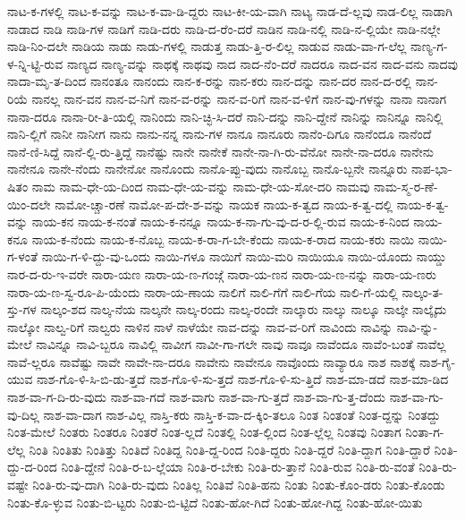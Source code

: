 {ನಾಟ-ಕ-ಗಳಲ್ಲಿ
ನಾಟ-ಕ-ವನ್ನು
ನಾಟ-ಕ-ವಾ-ಡಿ-ದ್ದರು
ನಾಟ-ಕೀ-ಯ-ವಾಗಿ
ನಾಟ್ಯ
ನಾಡ-ದೆ-ಲ್ಲವು
ನಾಡ-ಲಿಲ್ಲ
ನಾಡಾಗಿ
ನಾಡಾದ
ನಾಡಿ
ನಾಡಿ-ಗಳ
ನಾಡಿಗೆ
ನಾಡಿ-ದರು
ನಾಡಿ-ದ-ರೆಂ-ದರೆ
ನಾಡಿನ
ನಾಡಿ-ನಲ್ಲಿ
ನಾಡಿ-ನ-ಲ್ಲಿಯೇ
ನಾಡಿ-ನಲ್ಲೇ
ನಾಡಿ-ನಿಂ-ದಲೇ
ನಾಡಿಯ
ನಾಡು
ನಾಡು-ಗಳಲ್ಲಿ
ನಾಡುತ್ತ
ನಾಡು-ತ್ತಿ-ರ-ಲಿಲ್ಲ
ನಾಡುವ
ನಾಡು-ವಾ-ಗ-ಲೆಲ್ಲ
ನಾಣ್ಯ-ಗ-ಳ-ನ್ನಿ-ಟ್ಟಿ-ರುವ
ನಾಣ್ಯದ
ನಾಣ್ಯ-ವನ್ನು
ನಾಥಕ್ಕೆ
ನಾಥವು
ನಾದ
ನಾದ-ನೆಂ-ದರೆ
ನಾದರೂ
ನಾದ-ವನ
ನಾದ-ವನು
ನಾದವು
ನಾದಾ-ಮೃ-ತ-ದಿಂದ
ನಾನಂತೂ
ನಾನಂದು
ನಾನ-ಕ-ರನ್ನು
ನಾನ-ಕರು
ನಾನ-ದನ್ನು
ನಾನ-ದರ
ನಾನ-ದ-ರಲ್ಲಿ
ನಾನ-ರಿಯೆ
ನಾನಲ್ಲ
ನಾನ-ವನ
ನಾನ-ವ-ನಿಗೆ
ನಾನ-ವ-ರನ್ನು
ನಾನ-ವ-ರಿಗೆ
ನಾನ-ವ-ಳಿಗೆ
ನಾನ-ವು-ಗಳನ್ನು
ನಾನಾ
ನಾನಾಗ
ನಾನಾ-ದರೂ
ನಾನಾ-ರೀ-ತಿ-ಯಲ್ಲಿ
ನಾನಿಂದು
ನಾನಿ-ಚ್ಛಿ-ಸಿ-ದರೆ
ನಾನಿ-ದನ್ನು
ನಾನಿ-ದ್ದೇನೆ
ನಾನಿನ್ನು
ನಾನಿನ್ನೂ
ನಾನಿಲ್ಲಿ
ನಾನಿ-ಲ್ಲಿಗೆ
ನಾನೀ
ನಾನೀಗ
ನಾನು
ನಾನು-ನನ್ನ
ನಾನು-ಗಳ
ನಾನೂ
ನಾನೂರು
ನಾನೆಂ-ದಿಗೂ
ನಾನೆಂದೂ
ನಾನೆಂದೆ
ನಾನೆ-ಣಿ-ಸಿದ್ದೆ
ನಾನೆ-ಲ್ಲಿ-ರು-ತ್ತಿದ್ದೆ
ನಾನೆಷ್ಟು
ನಾನೇ
ನಾನೇಕೆ
ನಾನೇ-ನಾ-ಗಿ-ರು-ವೆನೋ
ನಾನೇ-ನಾ-ದರೂ
ನಾನೇನು
ನಾನೇನೂ
ನಾನೇ-ನೆಂದು
ನಾನೇನೋ
ನಾನೊಂದು
ನಾನೊ-ಪ್ಪು-ವುದು
ನಾನೊಬ್ಬ
ನಾನೊ-ಬ್ಬನೇ
ನಾನ್ನೂರು
ನಾಪ-ಭಾ-ಷಿತಂ
ನಾಮ
ನಾಮ-ಧೇ-ಯ-ದಿಂದ
ನಾಮ-ಧೇ-ಯ-ವನ್ನು
ನಾಮ-ಧೇ-ಯ-ಸೋ-ದರಿ
ನಾಮವು
ನಾಮ-ಸ್ಮ-ರ-ಣೆ-ಯಿಂ-ದಲೇ
ನಾಮೋ-ಚ್ಚಾ-ರಣೆ
ನಾಮೋ-ಪ-ದೇ-ಶ-ವನ್ನು
ನಾಯಕ
ನಾಯ-ಕ-ತ್ವದ
ನಾಯ-ಕ-ತ್ವ-ದಲ್ಲಿ
ನಾಯ-ಕ-ತ್ವ-ವನ್ನು
ನಾಯ-ಕನ
ನಾಯ-ಕ-ನಂತೆ
ನಾಯ-ಕ-ನನ್ನೂ
ನಾಯ-ಕ-ನಾ-ಗು-ವು-ದ-ರ-ಲ್ಲಿ-ರುವ
ನಾಯ-ಕ-ನಿಂದ
ನಾಯ-ಕನೂ
ನಾಯ-ಕ-ನೆಂದು
ನಾಯ-ಕ-ನೊಬ್ಬ
ನಾಯ-ಕ-ರಾ-ಗ-ಬೇ-ಕೆಂದು
ನಾಯ-ಕ-ರಾದ
ನಾಯ-ಕರು
ನಾಯಿ
ನಾಯಿ-ಗ-ಳಂತೆ
ನಾಯಿ-ಗ-ಳಿ-ದ್ದು-ವು-ಒಂದು
ನಾಯಿ-ಗಳೂ
ನಾಯಿಗೆ
ನಾಯಿ-ಮರಿ
ನಾಯಿಯೂ
ನಾಯಿ-ಯೊಂದು
ನಾಯ್ಡು
ನಾರ-ದ-ರು-ಇ-ವರೇ
ನಾರಾ-ಯಣ
ನಾರಾ-ಯ-ಣ-ಗಂಜ್ಗೆ
ನಾರಾ-ಯ-ಣನ
ನಾರಾ-ಯ-ಣ-ನನ್ನು
ನಾರಾ-ಯ-ಣರು
ನಾರಾ-ಯ-ಣ-ಸ್ವ-ರೂ-ಪಿ-ಯೆಂದು
ನಾರಾ-ಯ-ಣಾಯ
ನಾಲಿಗೆ
ನಾಲಿ-ಗೆಗೆ
ನಾಲಿ-ಗೆಯ
ನಾಲಿ-ಗೆ-ಯಲ್ಲಿ
ನಾಲ್ಕಂ-ತ-ಸ್ತು-ಗಳ
ನಾಲ್ಕಂ-ಶದ
ನಾಲ್ಕ-ನೆಯ
ನಾಲ್ಕನೇ
ನಾಲ್ಕ-ರಂದು
ನಾಲ್ಕ-ರಂದೇ
ನಾಲ್ಕಾರು
ನಾಲ್ಕು
ನಾಲ್ಕೂ
ನಾಲ್ಕೇ
ನಾಲ್ಕೈದು
ನಾಲ್ಕೋ
ನಾಲ್ವ-ರಿಗೆ
ನಾಲ್ವರು
ನಾಳಿನ
ನಾಳೆ
ನಾಳೆಯೇ
ನಾವ-ದನ್ನು
ನಾವ-ವ-ರಿಗೆ
ನಾವಿಂದು
ನಾವಿನ್ನು
ನಾವಿ-ನ್ನು-ಮೇಲೆ
ನಾವಿನ್ನೂ
ನಾವಿ-ಬ್ಬರೂ
ನಾವಿಲ್ಲಿ
ನಾವೀಗ
ನಾವೀ-ಗಾ-ಗಲೇ
ನಾವು
ನಾವೂ
ನಾವೆಂದೂ
ನಾವೆಂ-ಬಂತೆ
ನಾವೆಲ್ಲ
ನಾವೆ-ಲ್ಲರೂ
ನಾವೆಷ್ಟು
ನಾವೇ
ನಾವೇ-ನಾ-ದರೂ
ನಾವೇನು
ನಾವೇನೂ
ನಾವೊಂದು
ನಾವ್ಯಾರೂ
ನಾಶ
ನಾಶಕ್ಕೆ
ನಾಶ-ಗೈ-ಯುವ
ನಾಶ-ಗೊ-ಳಿ-ಸಿ-ಬಿ-ಡು-ತ್ತದೆ
ನಾಶ-ಗೊ-ಳಿ-ಸು-ತ್ತದೆ
ನಾಶ-ಗೊ-ಳಿ-ಸು-ತ್ತಿದೆ
ನಾಶ-ಮಾ-ಡದೆ
ನಾಶ-ಮಾ-ಡಿದ
ನಾಶ-ವಾ-ಗ-ದಿ-ರು-ವುದು
ನಾಶ-ವಾ-ಗದೆ
ನಾಶ-ವಾಗು
ನಾಶ-ವಾ-ಗು-ತ್ತದೆ
ನಾಶ-ವಾ-ಗು-ತ್ತ-ದೆಂದು
ನಾಶ-ವಾ-ಗು-ವು-ದಿಲ್ಲ
ನಾಶ-ವಾ-ದಾಗ
ನಾಶ-ವಿಲ್ಲ
ನಾಸ್ತಿ-ಕರು
ನಾಸ್ತಿ-ಕ-ವಾ-ದ-ಕ್ಕಿಂ-ತಲೂ
ನಿಂತ
ನಿಂತಂತೆ
ನಿಂತ-ದ್ದನ್ನು
ನಿಂತದ್ದು
ನಿಂತ-ಮೇಲೆ
ನಿಂತರು
ನಿಂತರೂ
ನಿಂತರೆ
ನಿಂತ-ಲ್ಲದೆ
ನಿಂತಲ್ಲಿ
ನಿಂತ-ಲ್ಲಿಂದ
ನಿಂತ-ಲ್ಲೆಲ್ಲ
ನಿಂತವು
ನಿಂತಾಗ
ನಿಂತಾ-ಗ-ಲೆಲ್ಲ
ನಿಂತಿ
ನಿಂತಿತು
ನಿಂತಿತ್ತು
ನಿಂತಿದೆ
ನಿಂತಿದ್ದ
ನಿಂತಿ-ದ್ದ-ರಿಂದ
ನಿಂತಿ-ದ್ದರು
ನಿಂತಿ-ದ್ದರೆ
ನಿಂತಿ-ದ್ದಾಗ
ನಿಂತಿ-ದ್ದಾರೆ
ನಿಂತಿ-ದ್ದು-ದ-ರಿಂದ
ನಿಂತಿ-ದ್ದೇನೆ
ನಿಂತಿ-ರ-ಬ-ಲ್ಲೆಯಾ
ನಿಂತಿ-ರ-ಬೇಕು
ನಿಂತಿ-ರು-ತ್ತಾನೆ
ನಿಂತಿ-ರುವ
ನಿಂತಿ-ರು-ವಂತೆ
ನಿಂತಿ-ರು-ವಷ್ಟೇ
ನಿಂತಿ-ರು-ವು-ದಾಗಿ
ನಿಂತಿ-ರು-ವುದು
ನಿಂತಿಲ್ಲ
ನಿಂತಿವೆ
ನಿಂತಿ-ಹನು
ನಿಂತು
ನಿಂತು-ಕೊಂ-ಡರು
ನಿಂತು-ಕೊಂಡು
ನಿಂತು-ಕೊ-ಳ್ಳುವ
ನಿಂತು-ಬಿ-ಟ್ಟರು
ನಿಂತು-ಬಿ-ಟ್ಟಿದೆ
ನಿಂತು-ಹೋ-ಗಿದೆ
ನಿಂತು-ಹೋ-ಗಿದ್ದ
ನಿಂತು-ಹೋ-ಯಿತು
}
